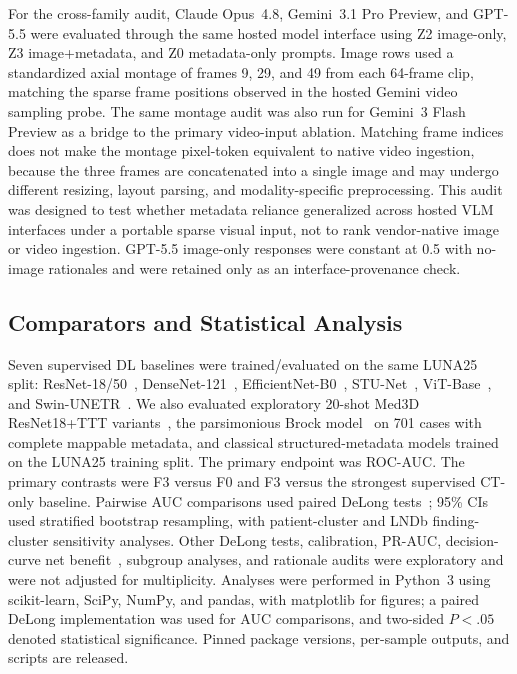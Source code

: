 \documentclass[11pt]{article}
\begin{document}
For the cross-family audit, Claude Opus~4.8, Gemini~3.1 Pro Preview, and GPT-5.5 were evaluated through the same hosted model interface using Z2 image-only, Z3 image+metadata, and Z0 metadata-only prompts. Image rows used a standardized axial montage of frames 9, 29, and 49 from each 64-frame clip, matching the sparse frame positions observed in the hosted Gemini video sampling probe. The same montage audit was also run for Gemini~3 Flash Preview as a bridge to the primary video-input ablation. Matching frame indices does not make the montage pixel-token equivalent to native video ingestion, because the three frames are concatenated into a single image and may undergo different resizing, layout parsing, and modality-specific preprocessing. This audit was designed to test whether metadata reliance generalized across hosted VLM interfaces under a portable sparse visual input, not to rank vendor-native image or video ingestion. GPT-5.5 image-only responses were constant at 0.5 with no-image rationales and were retained only as an interface-provenance check.

\subsection{Comparators and Statistical Analysis}

Seven supervised DL baselines were trained/evaluated on the same LUNA25 split: ResNet-18/50~\citep{ref-resnet}, DenseNet-121~\citep{ref-densenet}, EfficientNet-B0~\citep{ref-efficientnet}, STU-Net~\citep{ref-stunet}, ViT-Base~\citep{ref-vit}, and Swin-UNETR~\citep{ref-swin-unetr}. We also evaluated exploratory 20-shot Med3D ResNet18+TTT variants~\citep{ref-sun2024ttt}, the parsimonious Brock model~\citep{ref-mcwilliams} on 701 cases with complete mappable metadata, and classical structured-metadata models trained on the LUNA25 training split. The primary endpoint was ROC-AUC. The primary contrasts were F3 versus F0 and F3 versus the strongest supervised CT-only baseline. Pairwise AUC comparisons used paired DeLong tests~\citep{ref-delong}; 95\% CIs used stratified bootstrap resampling, with patient-cluster and LNDb finding-cluster sensitivity analyses. Other DeLong tests, calibration, PR-AUC, decision-curve net benefit~\citep{ref-vickers}, subgroup analyses, and rationale audits were exploratory and were not adjusted for multiplicity. Analyses were performed in Python~3 using scikit-learn, SciPy, NumPy, and pandas, with matplotlib for figures; a paired DeLong implementation was used for AUC comparisons, and two-sided $P<.05$ denoted statistical significance. Pinned package versions, per-sample outputs, and scripts are released.
\end{document}
